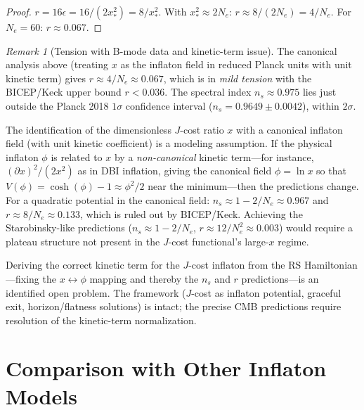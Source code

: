 \documentclass[12pt,a4paper]{article}
\theoremstyle{definition}
\theoremstyle{remark}
\newtheorem{remark}[theorem]{Remark}
\begin{document}
\begin{proof}
$r = 16\epsilon = 16/(2x_*^2) = 8/x_*^2$.  With
$x_*^2 \approx 2N_e$: $r \approx 8/(2N_e) = 4/N_e$.
For $N_e = 60$: $r \approx 0.067$.
\end{proof}

\begin{remark}[Tension with B-mode data and kinetic-term issue]
\label{rem:tension}
The canonical analysis above (treating $x$ as the inflaton
field in reduced Planck units with unit kinetic term) gives
$r \approx 4/N_e \approx 0.067$, which is in \emph{mild
tension} with the BICEP/Keck upper bound $r < 0.036$.
The spectral index $n_s \approx 0.975$ lies just outside
the Planck 2018 $1\sigma$ confidence interval
($n_s = 0.9649 \pm 0.0042$), within $2\sigma$.

The identification of the dimensionless $J$-cost ratio $x$
with a canonical inflaton field (with unit kinetic
coefficient) is a modeling assumption.  If the physical
inflaton $\phi$ is related to $x$ by a \emph{non-canonical}
kinetic term---for instance, $(\partial x)^2/(2x^2)$ as in
DBI inflation, giving the canonical field $\phi = \ln x$
so that $V(\phi) = \cosh(\phi) - 1 \approx \phi^2/2$ near
the minimum---then the predictions change.  For a quadratic
potential in the canonical field: $n_s \approx 1 - 2/N_e
\approx 0.967$ and $r \approx 8/N_e \approx 0.133$,
which is ruled out by BICEP/Keck.  Achieving the
Starobinsky-like predictions ($n_s \approx 1 - 2/N_e$,
$r \approx 12/N_e^2 \approx 0.003$) would require a
plateau structure not present in the $J$-cost functional's
large-$x$ regime.

Deriving the correct kinetic term for the $J$-cost
inflaton from the RS Hamiltonian---fixing the
$x \leftrightarrow \phi$ mapping and thereby the $n_s$
and $r$ predictions---is an identified open problem.
The framework ($J$-cost as inflaton potential, graceful
exit, horizon/flatness solutions) is intact; the
precise CMB predictions require resolution of the
kinetic-term normalization.
\end{remark}

\section{Comparison with Other Inflaton Models}
\label{sec:comparison}
\end{document}
